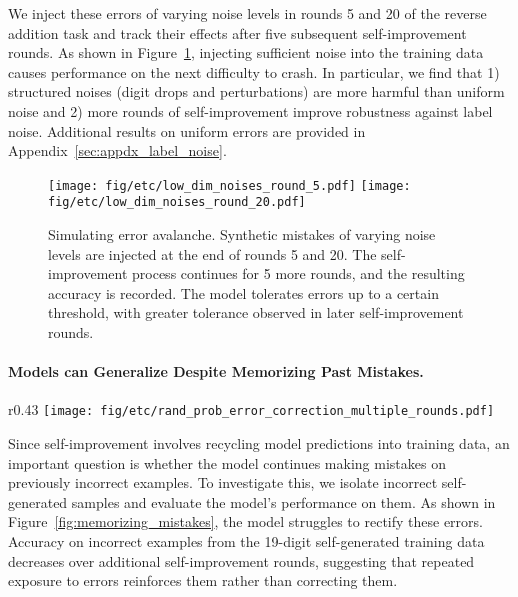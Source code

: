 We inject these errors of varying noise levels in rounds 5 and 20 of the reverse addition task and track their effects after five subsequent self-improvement rounds. As shown in Figure~\ref{fig:simulated_error}, injecting sufficient noise into the training data causes performance on the next difficulty to crash. In particular, we find that 1) structured noises (digit drops and perturbations) are more harmful than uniform noise and 2) more rounds of self-improvement improve robustness against label noise. Additional results on uniform errors are provided in Appendix~\ref{sec:appdx_label_noise}.


\begin{figure}
    \centering
    \texttt{[image: fig/etc/low\_dim\_noises\_round\_5.pdf]}
    \texttt{[image: fig/etc/low\_dim\_noises\_round\_20.pdf]}
    \caption{Simulating error avalanche. Synthetic mistakes of varying noise levels are injected at the end of rounds 5 and 20. The self-improvement process continues for 5 more rounds, and the resulting accuracy is recorded. The model tolerates errors up to a certain threshold, with greater tolerance observed in later self-improvement rounds.}
    \label{fig:simulated_error}
\end{figure}


\paragraph{Models can Generalize Despite Memorizing Past Mistakes.}

\begin{wrapfigure}{r}{0.43\textwidth}
    \vspace{-3mm}
    \centering
    \texttt{[image: fig/etc/rand\_prob\_error\_correction\_multiple\_rounds.pdf]}
    \caption{Models memorize their mistakes. Accuracy on incorrect training examples decreases with additional self-improvement rounds, indicating that repeated exposure reinforces errors instead of correcting them.}
    \vspace{-5mm}
    \label{fig:memorizing_mistakes}
\end{wrapfigure}

Since self-improvement involves recycling model predictions into training data, an important question is whether the model continues making mistakes on previously incorrect examples. To investigate this, we isolate incorrect self-generated samples and evaluate the model’s performance on them. 
As shown in Figure~\ref{fig:memorizing_mistakes}, the model struggles to rectify these errors. Accuracy on incorrect examples from the 19-digit self-generated training data decreases over additional self-improvement rounds, suggesting that repeated exposure to errors reinforces them rather than correcting them. %

